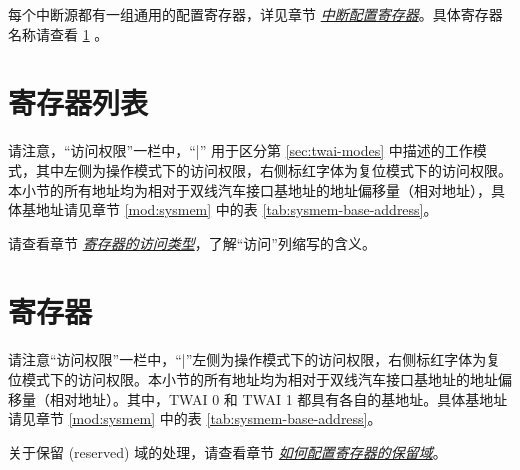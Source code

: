\documentclass[main\_\_CN.tex]{subfiles}
\begin{document}
每个中断源都有一组通用的配置寄存器，详见章节 \hyperref[interrupt-config-registers]{\textit{中断配置寄存器}}。具体寄存器名称请查看 \ref{sec:twai-reg-summ} \textit{}。





\newpage
\section{寄存器列表}
\label{sec:twai-reg-summ}
\hypertarget{twai-reg-summ}{}


请注意，“访问权限”一栏中，“|” 用于区分第 \ref{sec:twai-modes} 中描述的工作模式，其中左侧为操作模式下的访问权限，右侧标红字体为复位模式下的访问权限。本小节的所有地址均为相对于双线汽车接口基地址的地址偏移量（相对地址），具体基地址请见章节 \ref{mod:sysmem} \textit{} 中的表 \ref{tab:sysmem-base-address}。

请查看章节 \hyperref[glossary-access-types]{\textit{寄存器的访问类型}}，了解“访问”列缩写的含义。






\newpage
\section{寄存器}

请注意“访问权限”一栏中，“|”左侧为操作模式下的访问权限，右侧标红字体为复位模式下的访问权限。本小节的所有地址均为相对于双线汽车接口基地址的地址偏移量（相对地址）。其中，TWAI 0 和 TWAI 1 都具有各自的基地址。具体基地址请见章节 \ref{mod:sysmem} \textit{} 中的表 \ref{tab:sysmem-base-address}。

关于保留 (reserved) 域的处理，请查看章节 \hyperref[programming-reserved-field]{\textit{如何配置寄存器的保留域}}。



\end{document}
